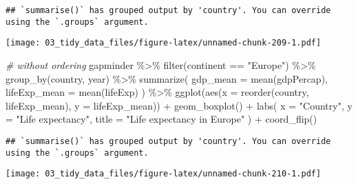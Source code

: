 \documentclass[
]{book}
\newenvironment{Shaded}{\begin{snugshade}}{\end{snugshade}}
\newcommand{\AttributeTok}[1]{\textcolor[rgb]{0.77,0.63,0.00}{#1}}
\newcommand{\CommentTok}[1]{\textcolor[rgb]{0.56,0.35,0.01}{\textit{#1}}}
\newcommand{\FunctionTok}[1]{\textcolor[rgb]{0.00,0.00,0.00}{#1}}
\newcommand{\NormalTok}[1]{#1}
\newcommand{\SpecialCharTok}[1]{\textcolor[rgb]{0.00,0.00,0.00}{#1}}
\newcommand{\StringTok}[1]{\textcolor[rgb]{0.31,0.60,0.02}{#1}}
\begin{document}
\begin{verbatim}
## `summarise()` has grouped output by 'country'. You can override using the `.groups` argument.
\end{verbatim}

\texttt{[image: 03\_tidy\_data\_files/figure-latex/unnamed-chunk-209-1.pdf]}

\begin{Shaded}
\begin{Highlighting}[]
\CommentTok{\# without ordering}
\NormalTok{gapminder }\SpecialCharTok{\%\textgreater{}\%}
  \FunctionTok{filter}\NormalTok{(continent }\SpecialCharTok{==} \StringTok{"Europe"}\NormalTok{) }\SpecialCharTok{\%\textgreater{}\%}
  \FunctionTok{group\_by}\NormalTok{(country, year) }\SpecialCharTok{\%\textgreater{}\%}
  \FunctionTok{summarize}\NormalTok{(}
    \AttributeTok{gdp\_mean =} \FunctionTok{mean}\NormalTok{(gdpPercap),}
    \AttributeTok{lifeExp\_mean =} \FunctionTok{mean}\NormalTok{(lifeExp)}
\NormalTok{  ) }\SpecialCharTok{\%\textgreater{}\%}
  \FunctionTok{ggplot}\NormalTok{(}\FunctionTok{aes}\NormalTok{(}\AttributeTok{x =} \FunctionTok{reorder}\NormalTok{(country, lifeExp\_mean), }\AttributeTok{y =}\NormalTok{ lifeExp\_mean)) }\SpecialCharTok{+}
  \FunctionTok{geom\_boxplot}\NormalTok{() }\SpecialCharTok{+}
  \FunctionTok{labs}\NormalTok{(}
    \AttributeTok{x =} \StringTok{"Country"}\NormalTok{,}
    \AttributeTok{y =} \StringTok{"Life expectancy"}\NormalTok{,}
    \AttributeTok{title =} \StringTok{"Life expectancy in Europe"}
\NormalTok{  ) }\SpecialCharTok{+}
  \FunctionTok{coord\_flip}\NormalTok{()}
\end{Highlighting}
\end{Shaded}

\begin{verbatim}
## `summarise()` has grouped output by 'country'. You can override using the `.groups` argument.
\end{verbatim}

\texttt{[image: 03\_tidy\_data\_files/figure-latex/unnamed-chunk-210-1.pdf]}
\end{document}
